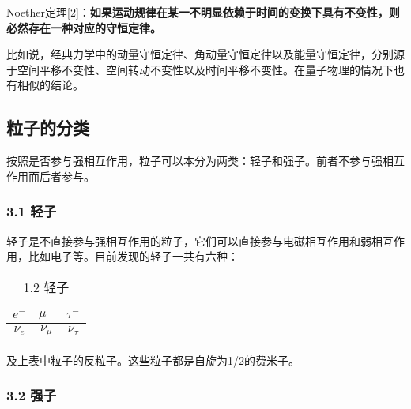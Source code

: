 Noether定理[2]：\textbf{如果运动规律在某一不明显依赖于时间的变换下具有不变性，则必然存在一种对应的守恒定律。}

比如说，经典力学中的动量守恒定律、角动量守恒定律以及能量守恒定律，分别源于空间平移不变性、空间转动不变性以及时间平移不变性。在量子物理的情况下也有相似的结论。

\subsection{粒子的分类}
按照是否参与强相互作用，粒子可以本分为两类：轻子和强子。前者不参与强相互作用而后者参与。

\subsubsection{3.1 轻子}
轻子是不直接参与强相互作用的粒子，它们可以直接参与电磁相互作用和弱相互作用，比如电子等。目前发现的轻子一共有六种：
\begin{table}[h!]
\centering
\caption{1.2 轻子}
\begin{tabular}{|c|c|c|} 
\hline
$e^-$ & $\mu^-$ & $\tau^-$ \\
\hline
$\nu_e$ & $\nu_\mu$ & $\nu_\tau$ \\
\hline
\end{tabular}
\end{table}
及上表中粒子的反粒子。这些粒子都是自旋为1/2的费米子。
\subsubsection{3.2 强子}